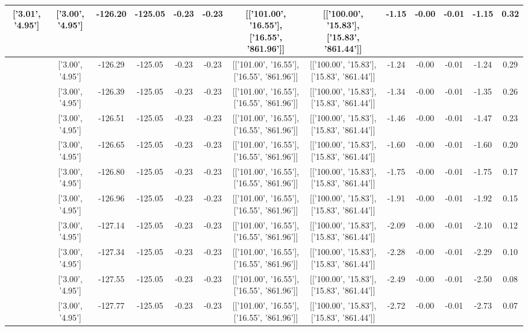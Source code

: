 \begin{table}[htbp]
\begin{adjustbox}{angle=90}
\begin{tabular}{|c|c|c|c|c|c|c|c|c|c|c|c|c|}
 ['3.01', '4.95'] & ['3.00', '4.95'] & -126.20 & -125.05 & -0.23 & -0.23 & [['101.00', '16.55'], ['16.55', '861.96']] & [['100.00', '15.83'], ['15.83', '861.44']] & -1.15 & -0.00 & -0.01 & -1.15 & 0.32\\ \hline
 ['3.01', '4.95'] & ['3.00', '4.95'] & -126.29 & -125.05 & -0.23 & -0.23 & [['101.00', '16.55'], ['16.55', '861.96']] & [['100.00', '15.83'], ['15.83', '861.44']] & -1.24 & -0.00 & -0.01 & -1.24 & 0.29\\ \hline
 ['3.01', '4.95'] & ['3.00', '4.95'] & -126.39 & -125.05 & -0.23 & -0.23 & [['101.00', '16.55'], ['16.55', '861.96']] & [['100.00', '15.83'], ['15.83', '861.44']] & -1.34 & -0.00 & -0.01 & -1.35 & 0.26\\ \hline
 ['3.01', '4.95'] & ['3.00', '4.95'] & -126.51 & -125.05 & -0.23 & -0.23 & [['101.00', '16.55'], ['16.55', '861.96']] & [['100.00', '15.83'], ['15.83', '861.44']] & -1.46 & -0.00 & -0.01 & -1.47 & 0.23\\ \hline
 ['3.01', '4.95'] & ['3.00', '4.95'] & -126.65 & -125.05 & -0.23 & -0.23 & [['101.00', '16.55'], ['16.55', '861.96']] & [['100.00', '15.83'], ['15.83', '861.44']] & -1.60 & -0.00 & -0.01 & -1.60 & 0.20\\ \hline
 ['3.01', '4.95'] & ['3.00', '4.95'] & -126.80 & -125.05 & -0.23 & -0.23 & [['101.00', '16.55'], ['16.55', '861.96']] & [['100.00', '15.83'], ['15.83', '861.44']] & -1.75 & -0.00 & -0.01 & -1.75 & 0.17\\ \hline
 ['3.01', '4.95'] & ['3.00', '4.95'] & -126.96 & -125.05 & -0.23 & -0.23 & [['101.00', '16.55'], ['16.55', '861.96']] & [['100.00', '15.83'], ['15.83', '861.44']] & -1.91 & -0.00 & -0.01 & -1.92 & 0.15\\ \hline
 ['3.01', '4.95'] & ['3.00', '4.95'] & -127.14 & -125.05 & -0.23 & -0.23 & [['101.00', '16.55'], ['16.55', '861.96']] & [['100.00', '15.83'], ['15.83', '861.44']] & -2.09 & -0.00 & -0.01 & -2.10 & 0.12\\ \hline
 ['3.02', '4.95'] & ['3.00', '4.95'] & -127.34 & -125.05 & -0.23 & -0.23 & [['101.00', '16.55'], ['16.55', '861.96']] & [['100.00', '15.83'], ['15.83', '861.44']] & -2.28 & -0.00 & -0.01 & -2.29 & 0.10\\ \hline
 ['3.02', '4.95'] & ['3.00', '4.95'] & -127.55 & -125.05 & -0.23 & -0.23 & [['101.00', '16.55'], ['16.55', '861.96']] & [['100.00', '15.83'], ['15.83', '861.44']] & -2.49 & -0.00 & -0.01 & -2.50 & 0.08\\ \hline
 ['3.02', '4.96'] & ['3.00', '4.95'] & -127.77 & -125.05 & -0.23 & -0.23 & [['101.00', '16.55'], ['16.55', '861.96']] & [['100.00', '15.83'], ['15.83', '861.44']] & -2.72 & -0.00 & -0.01 & -2.73 & 0.07\\ \hline

\end{tabular}
\end{adjustbox}
\end{table}
